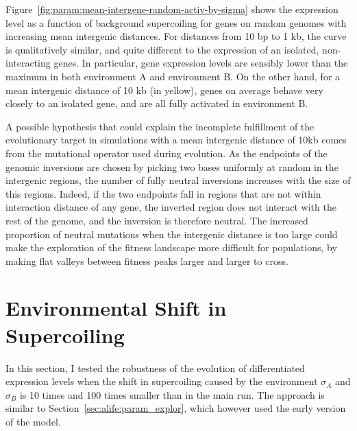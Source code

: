 Figure~\ref{fig:param:mean-intergene-random-activ-by-sigma} shows the expression level as a function of background supercoiling for genes on random genomes with increasing mean intergenic distances.
For distances from 10 bp to 1 kb, the curve is qualitatively similar, and quite different to the expression of an isolated, non-interacting genes.
In particular, gene expression levels are sensibly lower than the maximum in both environment A and environment B.
On the other hand, for a mean intergenic distance of 10 kb (in yellow), genes on average behave very closely to an isolated gene, and are all fully activated in environment B.

A possible hypothesis that could explain the incomplete fulfillment of the evolutionary target in simulations with a mean intergenic distance of 10kb comes from the mutational operator used during evolution.
As the endpoints of the genomic inversions are chosen by picking two bases uniformly at random in the intergenic regions, the number of fully neutral inversions increases with the size of this regions.
Indeed, if the two endpoints fall in regions that are not within interaction distance of any gene, the inverted region does not interact with the rest of the genome, and the inversion is therefore neutral.
The increased proportion of neutral mutations when the intergenic distance is too large could make the exploration of the fitness landscape more difficult for populations, by making flat valleys between fitness peaks larger and larger to cross.

\FloatBlock


\section{Environmental Shift in Supercoiling}
\label{sec:param:sigma-env}

In this section, I tested the robustness of the evolution of differentiated expression levels when the shift in supercoiling caused by the environment $\sigma_A$ and $\sigma_B$ is 10 times and 100 times smaller than in the main run.
The approach is similar to Section~\ref{sec:alife:param_explor}, which however used the early version of the model.

